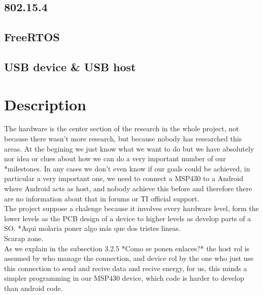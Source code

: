 		\subsection{802.15.4}
		\subsection{FreeRTOS}
		\subsection{USB device \& USB host}

	\section{Description}

	The hardware is the center section of the research in the whole project, not because there wasn't more research, but because nobody has researched this areas. At the begining we just know what we want to do but we have absolutely nor idea or clues about how we can do a very important number of our *milestones. In any cases we don't even know if our goals could be achieved, in particular a very important one, we need to connect a MSP430 to a Android where Android acts as host, and nobody achieve this before and therefore there are no information about that in forums or TI official support.\\

	The project suppose a chalenge because it involves every hardware level, form the lower levels as the PCB design of a device to higher levels as develop parts of a SO. *Aqui molaria poner algo más que dos tristes lineas. \\
	
	Scarap zone.\\
	As we explain in the subsection 3.2.5 *Como se ponen enlaces?* the host rol is assumed by who manage the connection, and device rol by the one who just use this connection to send and recive data and recive energy, for us, this minds a simpler programming in our MSP430 device, which code is harder to develop than android code.\\

